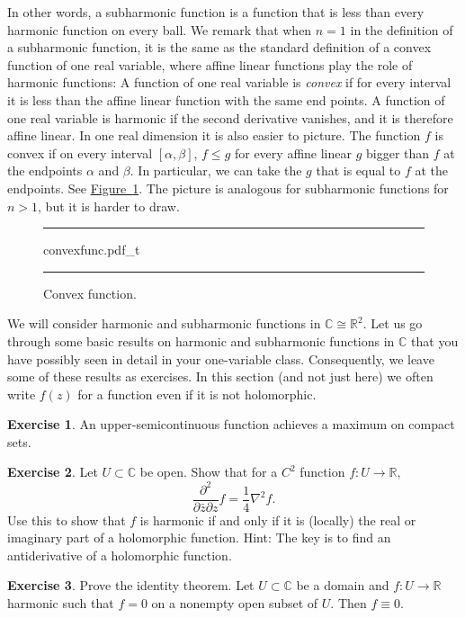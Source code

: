 \documentclass[12pt,openany]{book}
\newcommand{\C}{{\mathbb{C}}}
\newcommand{\R}{{\mathbb{R}}}
\theoremstyle{plain}
\theoremstyle{remark}
\theoremstyle{definition}
\newenvironment{exbox}{%
    \def\FrameCommand{\vrule width 1pt \relax\hspace{10pt}}%
    \MakeFramed{\advance\hsize-\width\FrameRestore}%
}{%
    \endMakeFramed
}
\newenvironment{myfig}{%
\begin{figure}[h!t]
\noindent\rule{\textwidth}{0.5pt}\vspace{12pt}\par\centering}%
{\par\noindent\rule{\textwidth}{0.5pt}
\end{figure}}
\theoremstyle{exercise}
\newtheorem{exercise}{Exercise}[section]
\theoremstyle{example}
\newcommand{\figureref}[1]{\hyperref[#1]{Figure~\ref*{#1}}}
\begin{document}
In other words, a subharmonic function is a function that is less than every
harmonic function on every ball.
We remark that when $n=1$ in the definition of a subharmonic function,
it is the same as the standard definition of a
convex function of one real variable, where affine linear functions play the role of harmonic
functions: A function of one real variable is
\emph{convex} if
for every interval it is less than the affine linear function with the same
end points.
A function of one real variable is harmonic if the second
derivative vanishes, and it is therefore affine linear.
In one real dimension it is also easier to picture.
The function $f$ is convex if on
every interval $[\alpha,\beta]$, $f \leq g$ for every affine linear $g$
bigger than $f$ at the endpoints $\alpha$ and $\beta$.  In particular, we can
take the $g$ that is equal to $f$ at the endpoints.  See
\figureref{fig:convexfunc}.
The picture is analogous for subharmonic functions for $n > 1$,
but it is harder to draw.

\begin{myfig}
{convexfunc.pdf_t}
\caption{Convex function.\label{fig:convexfunc}}
\end{myfig}

We will consider harmonic and subharmonic functions in $\C \cong
\R^2$.
Let us go through some basic results on harmonic and subharmonic
functions in $\C$ that you have possibly seen in detail in your one-variable class.
Consequently, we leave some of these results as exercises.
In this section (and not just here)
we often write $f(z)$ for a function
even if it is not holomorphic.

\begin{exbox}
\begin{exercise}
An upper-semicontinuous function achieves a maximum on compact sets.
\end{exercise}

\begin{exercise} \label{exercise:harmonicrealimag}
Let $U \subset \C$ be open.
Show that for a $C^2$ function $f \colon U \to \R$,
\begin{equation*}
\frac{\partial^2}{\partial \bar{z}\partial z} f = \frac{1}{4} \nabla^2 f .
\end{equation*}
Use this to show that $f$ is harmonic if and only if it is
(locally) the real or imaginary part
of a holomorphic function.
Hint: The key is to find an antiderivative of a holomorphic function.
\end{exercise}

\begin{exercise}
Prove the identity theorem.  Let $U \subset \C$ be a domain
and $f \colon U \to \R$ harmonic such that $f=0$ on a nonempty open subset
of $U$.  Then $f\equiv 0$.
\end{exercise}
\end{exbox}
\end{document}
